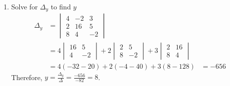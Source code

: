 \documentclass{report}
\begin{document}
{\begin{enumerate}
        \item Solve for $ \Delta_y $ to find $ y $ \[
                  \begin{align*}
                      \Delta_y & = \begin{vmatrix}
                                       4 & - 2 & 3   \\
                                       2 & 16  & 5   \\
                                       8 & 4   & - 2
                                   \end{vmatrix}                                       \\
                               & = 4 \begin{vmatrix}
                                         16 & 5   \\
                                         4  & - 2
                                     \end{vmatrix} + 2 \begin{vmatrix}
                                                           2 & 5   \\
                                                           8 & - 2
                                                       \end{vmatrix} + 3 \begin{vmatrix}
                                                                             2 & 16 \\
                                                                             8 & 4
                                                                         \end{vmatrix} \\
                               & = 4( - 32 - 20) + 2( - 4 - 40) + 3(8 - 128) & = - 656
                  \end{align*}
              \]
              Therefore, $ y = \frac{\Delta_y}{\Delta} = \frac{- 656}{- 82} = 8 $.


\end{enumerate}}
\end{document}
